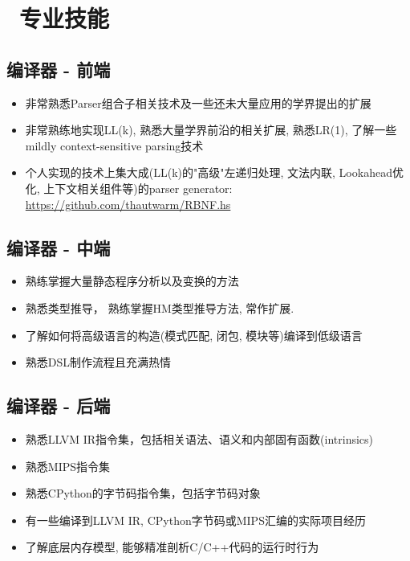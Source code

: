 \documentclass{resume}
\begin{document}



\section{\faCogs\ 专业技能}

\subsection{\textbf{编译器 - 前端}}
\begin{itemize}
    \item 非常熟悉Parser组合子相关技术及一些还未大量应用的学界提出的扩展
    \item 非常熟练地实现LL(k), 熟悉大量学界前沿的相关扩展, 熟悉LR(1), 了解一些mildly context-sensitive parsing技术
    \item 个人实现的技术上集大成(LL(k)的"高级"左递归处理, 文法内联, Lookahead优化, 上下文相关组件等)的parser generator: \url{https://github.com/thautwarm/RBNF.hs}
\end{itemize}


\subsection{\textbf{编译器 - 中端}}
\begin{itemize}
  \item 熟练掌握大量静态程序分析以及变换的方法
  \item 熟悉类型推导， 熟练掌握HM类型推导方法, 常作扩展.
  \item 了解如何将高级语言的构造(模式匹配, 闭包, 模块等)编译到低级语言
  \item 熟悉DSL制作流程且充满热情
\end{itemize}

\subsection{\textbf{编译器 - 后端}}
\begin{itemize}
  \item 熟悉LLVM IR指令集，包括相关语法、语义和内部固有函数(intrinsics)
  \item 熟悉MIPS指令集
  \item 熟悉CPython的字节码指令集，包括字节码对象
  \item 有一些编译到LLVM IR, CPython字节码或MIPS汇编的实际项目经历
  \item 了解底层内存模型, 能够精准剖析C/C++代码的运行时行为
\end{itemize}
\end{document}
